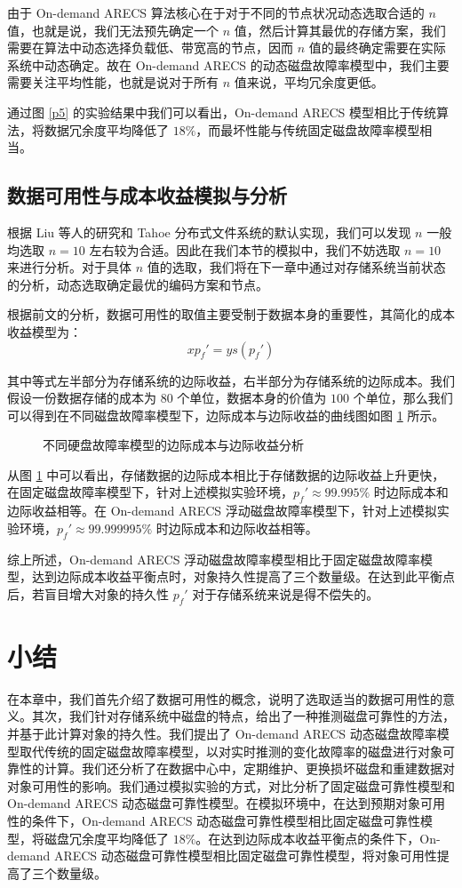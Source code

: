 由于 On-demand ARECS 算法核心在于对于不同的节点状况动态选取合适的 $n$ 值，也就是说，我们无法预先确定一个 $n$ 值，然后计算其最优的存储方案，我们需要在算法中动态选择负载低、带宽高的节点，因而 $n$ 值的最终确定需要在实际系统中动态确定。故在 On-demand ARECS 的动态磁盘故障率模型中，我们主要需要关注平均性能，也就是说对于所有 $n$ 值来说，平均冗余度更低。

通过图 \ref{p5} 的实验结果中我们可以看出，On-demand ARECS 模型相比于传统算法，将数据冗余度平均降低了 $18\%$，而最坏性能与传统固定磁盘故障率模型相当。
\subsection{数据可用性与成本收益模拟与分析}
根据 Liu 等人的研究\cite{liu2018implementation}和 Tahoe 分布式文件系统\cite{wilcox2008tahoe}的默认实现，我们可以发现 $n$ 一般均选取 $n=10$ 左右较为合适。因此在我们本节的模拟中，我们不妨选取 $n=10$ 来进行分析。对于具体 $n$ 值的选取，我们将在下一章中通过对存储系统当前状态的分析，动态选取确定最优的编码方案和节点。

根据前文的分析，数据可用性的取值主要受制于数据本身的重要性，其简化的成本收益模型为：
\begin{equation}
xp_{f}'=ys(p_{f}')
\end{equation}

其中等式左半部分为存储系统的边际收益，右半部分为存储系统的边际成本。我们假设一份数据存储的成本为 $80$ 个单位，数据本身的价值为 $100$ 个单位，那么我们可以得到在不同磁盘故障率模型下，边际成本与边际收益的曲线图如图 \ref{p14} 所示。

\begin{figure}[!htb]
\centering
\resizebox{.8\textwidth}{!}{}
\caption{不同硬盘故障率模型的边际成本与边际收益分析}
\label{p14}
\end{figure}

从图 \ref{p14} 中可以看出，存储数据的边际成本相比于存储数据的边际收益上升更快，在固定磁盘故障率模型下，针对上述模拟实验环境，$p_{f}'\approx99.995\%$ 时边际成本和边际收益相等。在 On-demand ARECS 浮动磁盘故障率模型下，针对上述模拟实验环境，$p_{f}'\approx99.999995\%$ 时边际成本和边际收益相等。

综上所述，On-demand ARECS 浮动磁盘故障率模型相比于固定磁盘故障率模型，达到边际成本收益平衡点时，对象持久性提高了三个数量级。在达到此平衡点后，若盲目增大对象的持久性 $p_{f}'$ 对于存储系统来说是得不偿失的。
\section{小结}
在本章中，我们首先介绍了数据可用性的概念，说明了选取适当的数据可用性的意义。其次，我们针对存储系统中磁盘的特点，给出了一种推测磁盘可靠性的方法，并基于此计算对象的持久性。我们提出了 On-demand ARECS 动态磁盘故障率模型取代传统的固定磁盘故障率模型，以对实时推测的变化故障率的磁盘进行对象可靠性的计算。我们还分析了在数据中心中，定期维护、更换损坏磁盘和重建数据对对象可用性的影响。我们通过模拟实验的方式，对比分析了固定磁盘可靠性模型和 On-demand ARECS 动态磁盘可靠性模型。在模拟环境中，在达到预期对象可用性的条件下，On-demand ARECS 动态磁盘可靠性模型相比固定磁盘可靠性模型，将磁盘冗余度平均降低了 $18\%$。在达到边际成本收益平衡点的条件下，On-demand ARECS 动态磁盘可靠性模型相比固定磁盘可靠性模型，将对象可用性提高了三个数量级。
